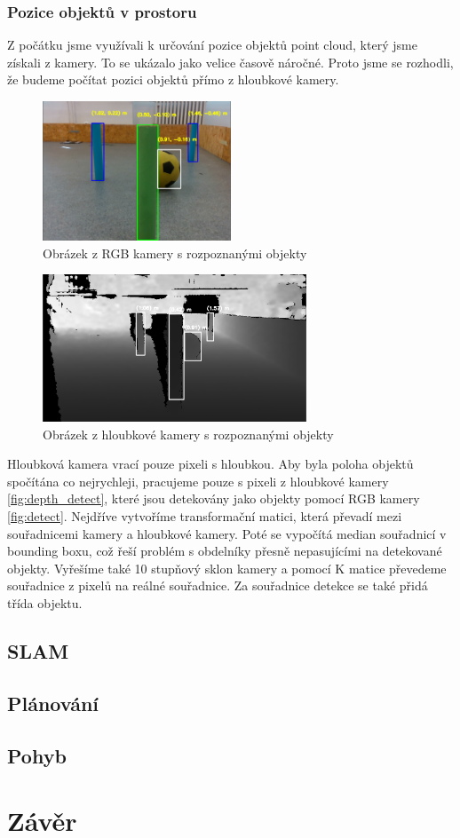 \documentclass[a4paper,12pt]{article}
\begin{document}
\subsubsection{Pozice objektů v prostoru}
\label{sec:point_cloud}
Z počátku jsme využívali k určování pozice objektů point cloud, který jsme získali z kamery.
To se ukázalo jako velice časově náročné. Proto jsme se rozhodli, že budeme počítat pozici objektů přímo z hloubkové kamery.
\begin{figure}[H]
    \centering
    \includegraphics[width=0.5\textwidth]{pictures/detect.png}
    \caption{Obrázek z RGB kamery s rozpoznanými objekty}
    \label{fig:detect}
\end{figure}
\begin{figure}[H]
    \centering
    \includegraphics[width=0.7\textwidth]{pictures/depth_detect.png}
    \caption{Obrázek z hloubkové kamery s rozpoznanými objekty}
    \label{fig:depth_detect}
\end{figure}
Hloubková kamera vrací pouze pixeli s hloubkou. Aby byla poloha objektů spočítána co nejrychleji, pracujeme pouze s pixeli z hloubkové kamery \eqref{fig:depth_detect}, které jsou detekovány jako objekty pomocí RGB kamery \eqref{fig:detect}.
Nejdříve vytvoříme transformační matici, která převadí mezi souřadnicemi kamery a hloubkové kamery. Poté se vypočítá median souřadnicí v bounding boxu, což řeší problém s obdelníky přesně nepasujícími na detekované objekty.
Vyřešíme také 10 stupňový sklon kamery a pomocí K matice převedeme souřadnice z pixelů na reálné souřadnice. Za souřadnice detekce se také přidá třída objektu.

\subsection{SLAM}
\subsection{Plánování}
\subsection{Pohyb}
\section{Závěr}
\end{document}
